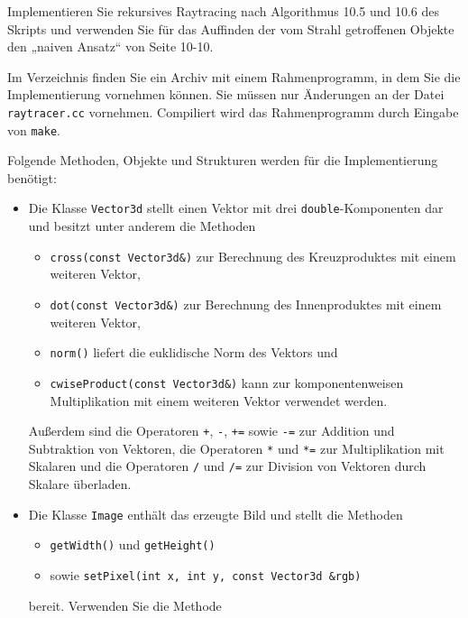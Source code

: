 \label{aufgabe:raytracing}
%
Implementieren Sie rekursives Raytracing nach Algorithmus 10.5 und 10.6
des Skripts und verwenden Sie für das Auf\/finden der vom Strahl 
getroffenen Objekte den „naiven Ansatz“ von Seite 10-10.

Im Verzeichnis  finden Sie 
ein Archiv mit einem Rahmenprogramm, in dem Sie 
die Implementierung vornehmen können. Sie müssen nur Änderungen an der 
Datei \texttt{raytracer.cc} vornehmen. Compiliert wird das 
Rahmenprogramm durch Eingabe von \texttt{make}.

Folgende Methoden, Objekte und Strukturen werden für die Implementierung 
benötigt:
\begin{itemize}
  \item Die Klasse \texttt{Vector3d} stellt einen Vektor mit drei
        \texttt{double}-Komponenten dar und besitzt unter anderem die
        Methoden
        \begin{itemize}
          \item \texttt{cross(const Vector3d\&)} zur Berechnung des
                Kreuzproduktes mit einem weiteren Vektor,
          \item \texttt{dot(const Vector3d\&)} zur Berechnung des
                Innenproduktes mit einem weiteren Vektor,
          \item \texttt{norm()} liefert die euklidische Norm des Vektors 
                und
          \item \texttt{cwiseProduct(const Vector3d\&)} kann zur
                komponentenweisen Multiplikation mit einem weiteren 
                Vektor verwendet werden.
        \end{itemize}
        Außerdem sind die Operatoren \texttt{+}, \texttt{-}, \texttt{+=}
        sowie \texttt{-=} zur Addition und Subtraktion von Vektoren, die
        Operatoren \texttt{*} und \texttt{*=} zur Multiplikation mit
        Skalaren und die Operatoren \texttt{/} und \texttt{/=} zur 
        Division von Vektoren durch Skalare überladen.
  \item Die Klasse \texttt{Image} enthält das erzeugte Bild und stellt 
        die Methoden
        \begin{itemize}
          \item \texttt{getWidth()} und \texttt{getHeight()}
          \item sowie \texttt{setPixel(int x, int y, const Vector3d \&rgb)}
        \end{itemize}
        bereit. Verwenden Sie die Methode

\end{itemize}
